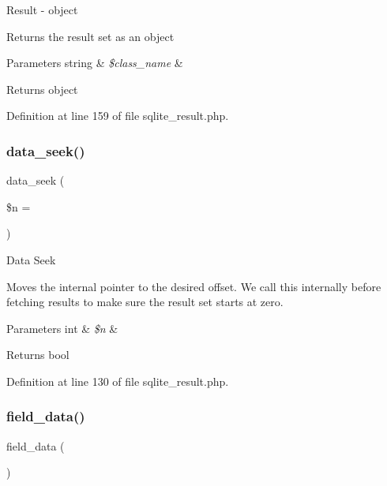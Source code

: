 Result -\/ object

Returns the result set as an object


\begin{DoxyParams}[1]{Parameters}
string & {\em \$class\+\_\+name} & \\
\hline
\end{DoxyParams}
\begin{DoxyReturn}{Returns}
object 
\end{DoxyReturn}


Definition at line 159 of file sqlite\+\_\+result.\+php.

\mbox{\label{class_c_i___d_b__sqlite__result_a8255ae91816e4206e29eb7581c5af0f1}} 
\subsubsection{\texorpdfstring{data\_seek()}{data\_seek()}}
{\footnotesize\ttfamily data\+\_\+seek (\begin{DoxyParamCaption}\item[{}]{\$n = {} }\end{DoxyParamCaption})}

Data Seek

Moves the internal pointer to the desired offset. We call this internally before fetching results to make sure the result set starts at zero.


\begin{DoxyParams}[1]{Parameters}
int & {\em \$n} & \\
\hline
\end{DoxyParams}
\begin{DoxyReturn}{Returns}
bool 
\end{DoxyReturn}


Definition at line 130 of file sqlite\+\_\+result.\+php.

\mbox{\label{class_c_i___d_b__sqlite__result_a84bffd65e53902ade1591716749a33e3}} 
\subsubsection{\texorpdfstring{field\_data()}{field\_data()}}
{\footnotesize\ttfamily field\+\_\+data (\begin{DoxyParamCaption}{ }\end{DoxyParamCaption})}

